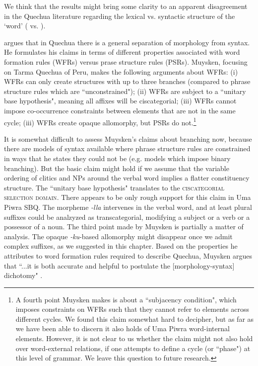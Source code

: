 \documentclass[output=paper]{langscibook}
\begin{document}
We think that the results might bring some clarity to an apparent disagreement in the Quechua literature regarding the lexical vs. syntactic structure of the `word' (\citealt{muysken:1981} vs. \citealt{weber1983relationship}).

\citet{muysken:1981} argues that in Quechua there is a general separation of morphology from syntax. He formulates his claims in terms of different properties associated with word formation rules (WFRs) versus prase structure rules (PSRs). Muysken, focusing on Tarma Quechua of Peru, makes the following arguments about WFRs: (i) WFRs can only create structures with up to three branches (compared to phrase structure rules which are ``unconstrained"); (ii) WFRs are subject to a ``unitary base hypothesis", meaning all affixes will be ciscategorial; (iii) WFRs cannot impose co-occurrence constraints between elements that are not in the same cycle; (iii) WFRs create opaque allomorphy, but PSRs do not.\footnote{A fourth point Muysken makes is about a ``subjacency condition", which imposes constraints on WFRs such that they cannot refer to elements across different cycles. We found this claim somewhat hard to decipher, but as far as we have been able to discern it also holds of Uma Piwra word-internal elements. However, it is not clear to us whether the claim might not also hold over word-external relations, if one attempts to define a cycle (or ``phase") at this level of grammar. We leave this question to future research.}

It is somewhat difficult to assess Muysken's claims about branching now, because there are models of syntax available where phrase structure rules are constrained in ways that he states they could not be (e.g. models which impose binary branching). But the basic claim might hold if we assume that the variable ordering of clitics and NPs around the verbal word implies a flatter constituency structure. The ``unitary base hypothesis" translates to the \textsc{ciscategorial selection domain}. There appears to be only rough support for this claim in Uma Piwra SBQ. The morpheme \textit{-lla} intervenes in the verbal word, and at least plural suffixes could be analzyzed as transcategorial, modifying a subject or a verb or a possessor of a noun. The third point made by Muysken is partially a matter of analysis. The opaque \textit{-ku}-based allomorphy might disappear once we admit complex suffixes, as we suggested in this chapter. Based on the properties he attributes to word formation rules required to describe Quechua, Muysken argues that ``...it is both accurate and helpful to postulate the [morphology-syntax] dichotomy" \citep[279]{muysken:1981}. 
\end{document}
